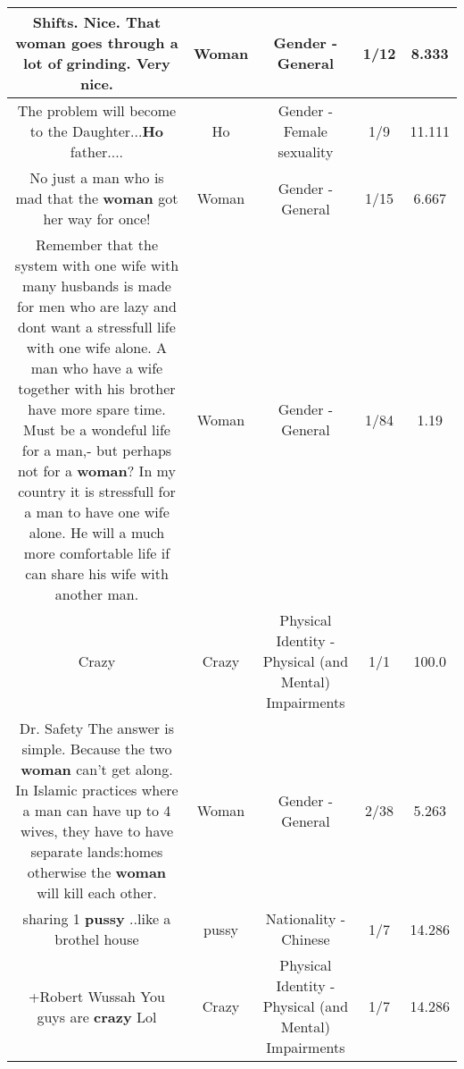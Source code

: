 \documentclass[11pt]{article}
\newlength\mylength
\begin{document}
\begin{center}
\begin{longtable}{|C{.65\mylength}|C{.30\mylength}|C{.12\mylength}|C{.12\mylength}|C{.12\mylength}|}
  \small Shifts.  Nice. That \textbf{woman} goes through a lot of grinding.  Very nice.\normalsize   & Woman & Gender - General & 1/12 & 8.333 \\  \hline
  \small The problem will become to the Daughter...\textbf{Ho} father....\normalsize   & Ho & Gender - Female sexuality & 1/9 & 11.111 \\  \hline
  \small No just a man who is mad that the \textbf{woman} got her way for once!\normalsize   & Woman & Gender - General & 1/15 & 6.667 \\  \hline
  \small Remember that the system with one wife with many husbands is made for men who are lazy and dont want a stressfull life with one wife alone. A man who have a wife together with his brother have more spare time. Must be a wondeful life for a man,- but perhaps not for a \textbf{woman}? In my country it is  stressfull for a man to have one wife alone. He will a much more comfortable life if can share his wife with another man.\normalsize   & Woman & Gender - General & 1/84 & 1.19 \\  \hline
  \small Crazy\normalsize   & Crazy & Physical Identity - Physical (and Mental) Impairments & 1/1 & 100.0 \\  \hline
  \small Dr. Safety The answer is simple. Because the two \textbf{woman} can't get along. In Islamic practices where a man can have up to 4 wives, they have to have separate lands:homes otherwise the \textbf{woman} will kill each other.\normalsize   & Woman & Gender - General & 2/38 & 5.263 \\  \hline
  \small sharing 1 \textbf{pussy} ..like a brothel house\normalsize   & pussy & Nationality - Chinese & 1/7 & 14.286 \\  \hline
  \small +Robert Wussah You guys are \textbf{crazy} Lol\normalsize   & Crazy & Physical Identity - Physical (and Mental) Impairments & 1/7 & 14.286 \\  \hline

\end{longtable}
\end{center}
\end{document}
